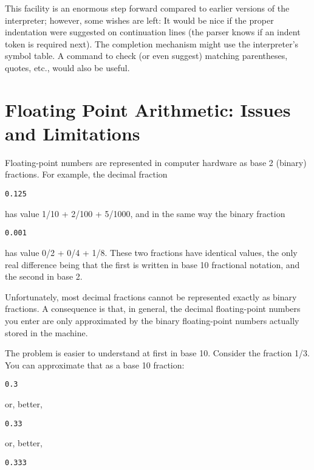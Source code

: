 \documentclass{manual}
\begin{document}
This facility is an enormous step forward compared to earlier versions
of the interpreter; however, some wishes are left: It would be nice if
the proper indentation were suggested on continuation lines (the
parser knows if an indent token is required next).  The completion
mechanism might use the interpreter's symbol table.  A command to
check (or even suggest) matching parentheses, quotes, etc., would also
be useful.


\chapter{Floating Point Arithmetic:  Issues and Limitations\label{fp-issues}}

Floating-point numbers are represented in computer hardware as
base 2 (binary) fractions.  For example, the decimal fraction

\begin{verbatim}
0.125
\end{verbatim}

has value 1/10 + 2/100 + 5/1000, and in the same way the binary fraction

\begin{verbatim}
0.001
\end{verbatim}

has value 0/2 + 0/4 + 1/8.  These two fractions have identical values,
the only real difference being that the first is written in base 10
fractional notation, and the second in base 2.

Unfortunately, most decimal fractions cannot be represented exactly as
binary fractions.  A consequence is that, in general, the decimal
floating-point numbers you enter are only approximated by the binary
floating-point numbers actually stored in the machine.

The problem is easier to understand at first in base 10.  Consider the
fraction 1/3.  You can approximate that as a base 10 fraction:

\begin{verbatim}
0.3
\end{verbatim}

or, better,

\begin{verbatim}
0.33
\end{verbatim}

or, better,

\begin{verbatim}
0.333
\end{verbatim}
\end{document}
